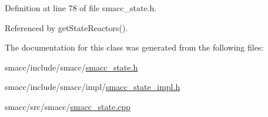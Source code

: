 Definition at line 78 of file smacc\+\_\+state.\+h.



Referenced by get\+State\+Reactors().



The documentation for this class was generated from the following files\+:\begin{DoxyCompactItemize}
\item 
smacc/include/smacc/\hyperlink{smacc__state_8h}{smacc\+\_\+state.\+h}\item 
smacc/include/smacc/impl/\hyperlink{smacc__state__impl_8h}{smacc\+\_\+state\+\_\+impl.\+h}\item 
smacc/src/smacc/\hyperlink{smacc__state_8cpp}{smacc\+\_\+state.\+cpp}\end{DoxyCompactItemize}
